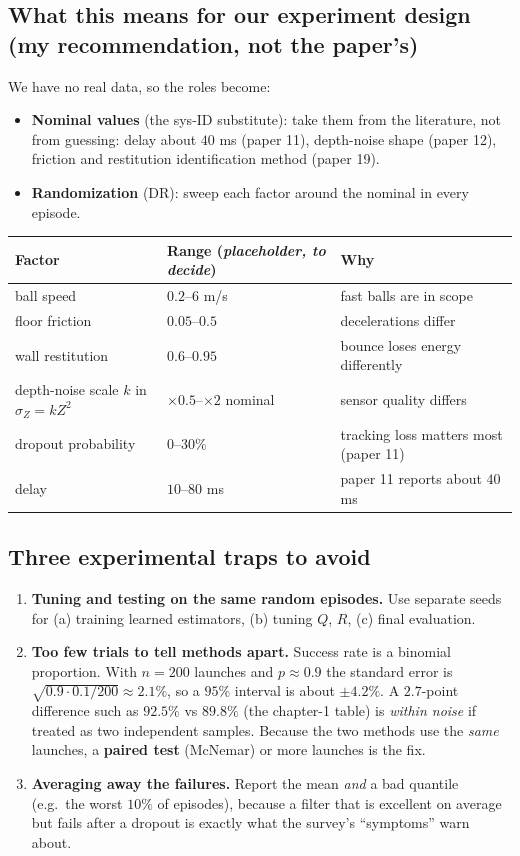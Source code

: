 \documentclass[11pt,a4paper]{article}
\begin{document}
\subsection{What this means for our experiment design \textnormal{(my recommendation, not the paper's)}}
We have no real data, so the roles become:
\begin{itemize}
\item \textbf{Nominal values} (the sys-ID substitute): take them from the literature, not from
guessing: delay about $40$ ms (paper 11), depth-noise shape (paper 12), friction and restitution
identification method (paper 19).
\item \textbf{Randomization} (DR): sweep each factor around the nominal in every episode.
\end{itemize}
\begin{center}
\renewcommand{\arraystretch}{1.2}
\begin{tabularx}{\textwidth}{@{}l l X@{}}
\toprule
Factor & Range (\emph{placeholder, to decide}) & Why \\
\midrule
ball speed & $0.2$--$6$ m/s & fast balls are in scope \\
floor friction & $0.05$--$0.5$ & decelerations differ \\
wall restitution & $0.6$--$0.95$ & bounce loses energy differently \\
depth-noise scale $k$ in $\sigma_Z=kZ^2$ & $\times0.5$--$\times2$ nominal & sensor quality differs \\
dropout probability & $0$--$30\%$ & tracking loss matters most (paper 11) \\
delay & $10$--$80$ ms & paper 11 reports about $40$ ms \\
\bottomrule
\end{tabularx}
\end{center}

\subsection{Three experimental traps to avoid}
\begin{enumerate}
\item \textbf{Tuning and testing on the same random episodes.} Use separate seeds for (a) training
learned estimators, (b) tuning $Q$, $R$, (c) final evaluation.
\item \textbf{Too few trials to tell methods apart.} Success rate is a binomial proportion. With
$n=200$ launches and $p\approx0.9$ the standard error is $\sqrt{0.9\cdot0.1/200}\approx2.1\%$, so a
$95\%$ interval is about $\pm4.2\%$. A $2.7$-point difference such as $92.5\%$ vs $89.8\%$ (the
chapter-1 table) is \emph{within noise} if treated as two independent samples. Because the two
methods use the \emph{same} launches, a \textbf{paired test} (McNemar) or more launches is the fix.
\item \textbf{Averaging away the failures.} Report the mean \emph{and} a bad quantile (e.g.\ the
worst $10\%$ of episodes), because a filter that is excellent on average but fails after a dropout
is exactly what the survey's ``symptoms'' warn about.
\end{enumerate}
\end{document}
